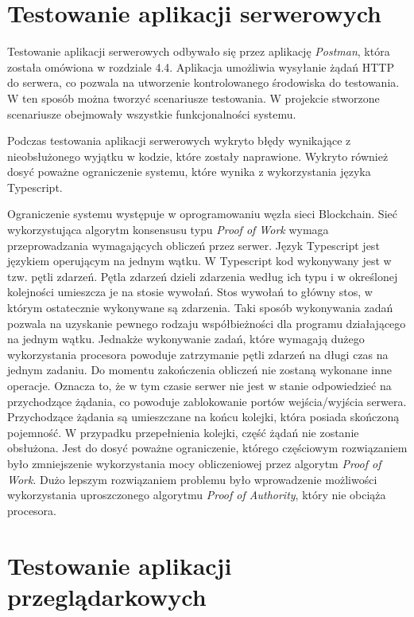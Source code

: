 \documentclass[a4paper,12pt]{book}
\begin{document}
\section{Testowanie aplikacji serwerowych}

Testowanie aplikacji serwerowych odbywało się przez aplikację \textit{Postman}, która została omówiona w rozdziale 4.4. Aplikacja umożliwia wysyłanie żądań HTTP do serwera, co pozwala na utworzenie kontrolowanego środowiska do testowania. W ten sposób można tworzyć scenariusze testowania. W projekcie stworzone scenariusze obejmowały wszystkie funkcjonalności systemu.
 
Podczas testowania aplikacji serwerowych wykryto błędy wynikające z nieobsłużonego wyjątku w kodzie, które zostały naprawione. Wykryto również dosyć poważne ograniczenie systemu, które wynika z wykorzystania języka Typescript.
 
Ograniczenie systemu występuje w oprogramowaniu węzła sieci Blockchain. Sieć wykorzystująca algorytm konsensusu typu \textit{Proof of Work} wymaga przeprowadzania wymagających obliczeń przez serwer. Język Typescript jest językiem operującym na jednym wątku. W Typescript kod wykonywany jest w tzw. pętli zdarzeń. Pętla zdarzeń dzieli zdarzenia według ich typu i w określonej kolejności umieszcza je na stosie wywołań. Stos wywołań to główny stos, w którym ostatecznie wykonywane są zdarzenia. Taki sposób wykonywania zadań pozwala na uzyskanie pewnego rodzaju współbieżności dla programu działającego na jednym wątku. Jednakże wykonywanie zadań, które wymagają dużego wykorzystania procesora powoduje zatrzymanie pętli zdarzeń na długi czas na jednym zadaniu. Do momentu zakończenia obliczeń nie zostaną wykonane inne operacje. Oznacza to, że w tym czasie serwer nie jest w stanie odpowiedzieć na przychodzące żądania, co powoduje zablokowanie portów wejścia/wyjścia serwera. Przychodzące żądania są umieszczane na końcu kolejki, która posiada skończoną pojemność. W przypadku przepełnienia kolejki, część żądań nie zostanie obsłużona. Jest do dosyć poważne ograniczenie, którego częściowym rozwiązaniem było zmniejszenie wykorzystania mocy obliczeniowej przez algorytm \textit{Proof of Work}. Dużo lepszym rozwiązaniem problemu było wprowadzenie możliwości wykorzystania uproszczonego algorytmu \textit{Proof of Authority}, który nie obciąża procesora.

\section{Testowanie aplikacji przeglądarkowych}
\end{document}
